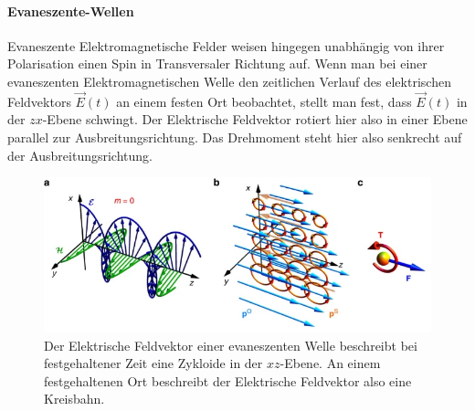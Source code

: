 \documentclass[titlepage]{article}
\begin{document}
	\paragraph{Evaneszente-Wellen}	
	Evaneszente Elektromagnetische Felder weisen hingegen unabhängig von ihrer Polarisation einen Spin in Transversaler Richtung auf. Wenn man bei einer evaneszenten Elektromagnetischen Welle den zeitlichen Verlauf des elektrischen Feldvektors $\vec{E}(t)$ an einem festen Ort beobachtet, stellt man fest, dass $\vec{E}(t)$ in der $zx$-Ebene schwingt. Der Elektrische Feldvektor rotiert hier also in einer Ebene parallel zur Ausbreitungsrichtung. Das Drehmoment steht hier also senkrecht auf der Ausbreitungsrichtung. \cite{Bliokh.2014}
	
		
	\begin{figure}[h]
		\centering
		\includegraphics[width=0.7\linewidth]{figures/spin/ev_spin}
		\caption{Der Elektrische Feldvektor einer evaneszenten Welle beschreibt bei festgehaltener Zeit eine Zykloide in der $xz$-Ebene. An einem festgehaltenen Ort beschreibt der Elektrische Feldvektor also eine Kreisbahn.}
		\label{fig:ev_spin}
	\end{figure}
\end{document}
